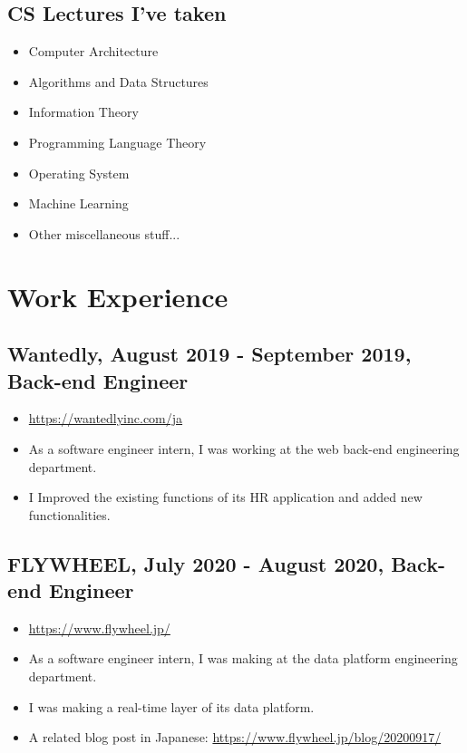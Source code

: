 \documentclass{article}
\begin{document}
  \subsection*{CS Lectures I've taken}
    \begin{itemize}
      \item Computer Architecture
      \item Algorithms and Data Structures
      \item Information Theory
      \item Programming Language Theory
      \item Operating System
      \item Machine Learning
      \item Other miscellaneous stuff...
    \end{itemize}

\section*{Work Experience}
  \subsection*{Wantedly, August 2019 - September 2019, Back-end Engineer}
    \begin{itemize}
      \item \url{https://wantedlyinc.com/ja}
      \item As a software engineer intern, I was working at the web back-end engineering department.
      \item I Improved the existing functions of its HR application and added new functionalities.
    \end{itemize}

  \subsection*{FLYWHEEL, July 2020 - August 2020, Back-end Engineer}
    \begin{itemize}
      \item \url{https://www.flywheel.jp/}
      \item As a software engineer intern, I was making at the data platform engineering department.
      \item I was making a real-time layer of its data platform.
      \item A related blog post in Japanese: \url{https://www.flywheel.jp/blog/20200917/}
    \end{itemize}
\end{document}
